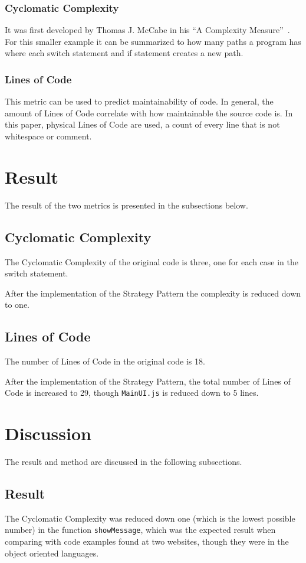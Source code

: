 \documentclass[conference, a4paper]{IEEEtran}
\begin{document}
\subsubsection{Cyclomatic Complexity}
It was first developed by Thomas J. McCabe in his ``A Complexity Measure''~\cite{bibitem:CC}. For this smaller example it can be summarized to how many paths a program has where each switch statement and if statement creates a new path.

\subsubsection{Lines of Code}
This metric can be used to predict maintainability of code. In general, the amount of Lines of Code correlate with how maintainable the source code is. In this paper, physical Lines of Code are used, a count of every line that is not whitespace or comment.

\section{Result}
The result of the two metrics is presented in the subsections below.

\subsection{Cyclomatic Complexity}
The Cyclomatic Complexity of the original code is three, one for each case in the switch statement.

After the implementation of the Strategy Pattern the complexity is reduced down to one.

\subsection{Lines of Code}
The number of Lines of Code in the original code is 18.

After the implementation of the Strategy Pattern, the total number of Lines of Code is increased to 29, though \texttt{MainUI.js} is reduced down to 5 lines.

\section{Discussion}
The result and method are discussed in the following subsections.

\subsection{Result}
The Cyclomatic Complexity was reduced down one (which is the lowest possible number) in the function \texttt{showMessage}, which was the expected result when comparing with code examples found at two websites, though they were in the object oriented languages.
\end{document}
